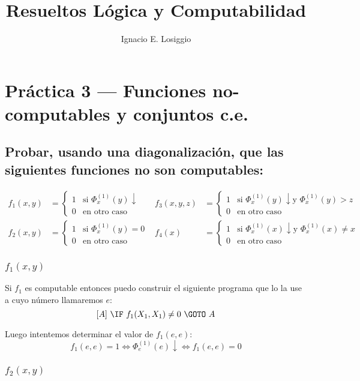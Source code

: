\documentclass[fleqn, 11pt]{article}
\title{Resueltos Lógica y Computabilidad}
\author{Ignacio E. Losiggio}
\newcommand{\ddef}{\downarrow}
\begin{document}
\maketitle
\section{Práctica 3 --- Funciones no-computables y conjuntos c.e.}

\subsection{Probar, usando una diagonalización, que las siguientes funciones no
son computables:}

\begin{align*}
	f_1(x, y) &=
	\begin{cases}
		1 & \text{si } \Phi^{(1)}_x(y) \ddef \\
		0 & \text{en otro caso}
	\end{cases}
	&f_3(x, y, z) &=
	\begin{cases}
		1 & \text{si } \Phi^{(1)}_x(y) \ddef
		    \text{y } \Phi^{(1)}_x(y) > z \\
		0 & \text{en otro caso}
	\end{cases} \\
	f_2(x, y) &=
	\begin{cases}
		1 & \text{si } \Phi^{(1)}_x(y) = 0 \\
		0 & \text{en otro caso}
	\end{cases}
	&f_4(x) &=
	\begin{cases}
		1 & \text{si } \Phi^{(1)}_x(x) \ddef
		    \text{y } \Phi^{(1)}_x(x) \neq x \\
		0 & \text{en otro caso}
	\end{cases}
\end{align*}

\subsubsection{$f_1(x, y)$}

Si $f_1$ es computable entonces puedo construir el siguiente programa que lo
la use a cuyo número llamaremos $e$:
\[
	[A]\ \IF\ f_1(X_1, X_1) \neq 0\ \GOTO\ A
\]

Luego intentemos determinar el valor de $f_1(e, e)$:
\[
	f_1(e, e) = 1
	\iff \Phi^{(1)}_e(e) \ddef
	\iff f_1(e, e) = 0
\]

\subsubsection{$f_2(x, y)$}
\end{document}
